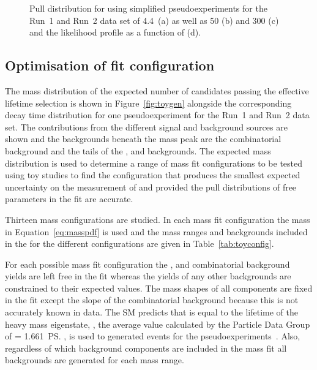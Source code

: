 {\begin{figure}[tbp]
  \caption{Pull distribution for \Gmumu using simplified pseudoexperiments for the Run~1 and Run~2 data set of 4.4~\fb (a) as well as 50 (b) and 300 (c) \fb and the likelihood profile as a function of \Gmumu (d).}
    \label{fig:gammapulls}
\end{figure}




\subsection{Optimisation of fit configuration}
\label{sec:toyresults}

The mass distribution of the expected number of \bsmumu candidates passing the effective lifetime selection is shown in Figure~\ref{fig:toygen} alongside the corresponding decay time distribution for one pseudoexperiment for the Run~1 and Run~2 data set. 
The contributions from the different signal and background sources are shown and the backgrounds beneath the \bs mass peak are the combinatorial background and the tails of the \bhh, \bdmumu and \lambdab backgrounds. The expected mass distribution is used to determine a range of mass fit configurations to be tested using toy studies to find the configuration that produces the smallest expected uncertainty on the measurement of \tmumu and \Gmumu provided the pull distributions of free parameters in the fit are accurate.



Thirteen mass configurations are studied. In each mass fit configuration the mass \pdf in Equation~\ref{eq:masspdf} is used and the mass ranges and backgrounds included in the \pdf for the different configurations are given in Table~\ref{tab:toyconfig}.


For each possible mass fit configuration the \bsmumu, \bdmumu and combinatorial background yields are left free in the fit whereas the yields of any other backgrounds are constrained to their expected values. The mass shapes of all components are fixed in the \ml fit except the slope of the combinatorial background because this is not accurately known in data. 
The SM predicts that \tmumu is equal to the lifetime of the heavy \bs mass eigenstate, \tH, the average value calculated by the Particle Data Group of \tmumu = 1.661~\ps, is used to generated events for the pseudoexperiments~\cite{Olive:2016xmw}. %
Also, regardless of which background components are included in the mass fit all backgrounds are generated for each mass range. %

}
